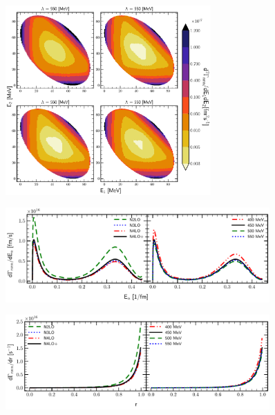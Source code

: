     \begin{figure}[h]
        \begin{center}
        \includegraphics[width=0.7\textwidth]{PlotData/PION/Dalitz_maps/figures/Dalitz_map_nnn_E1E2_orders.pdf}
        \end{center}
        \caption{}
        \label{pion_nnn_E1E2_order}
    \end{figure}

    \begin{figure}[h]
        \begin{center}
        \includegraphics[width=0.9\textwidth]{PlotData/PION/Dalitz_maps/figures/3H_dGdEn.pdf}
        \end{center}
        \caption{}
        \label{pion_dGdEn_3H}
    \end{figure}

    \begin{figure}[h]
        \begin{center}
        \includegraphics[width=0.9\textwidth]{PlotData/PION/Dalitz_maps/figures/3H_dGdr.pdf}
        \end{center}
        \caption{}
        \label{pion_dGdr_3H}
    \end{figure}


